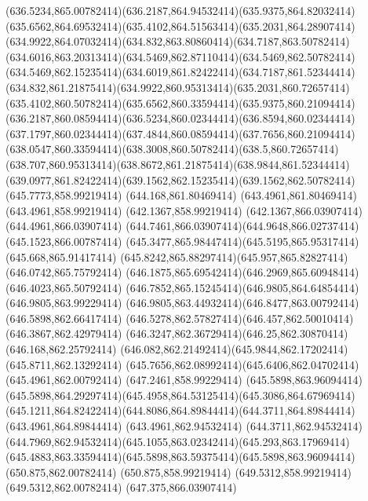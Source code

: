 {{	\curveto(636.5234,865.00782414)(636.2187,864.94532414)(635.9375,864.82032414)
	\curveto(635.6562,864.69532414)(635.4102,864.51563414)(635.2031,864.28907414)
	\curveto(634.9922,864.07032414)(634.832,863.80860414)(634.7187,863.50782414)
	\curveto(634.6016,863.20313414)(634.5469,862.87110414)(634.5469,862.50782414)
	\curveto(634.5469,862.15235414)(634.6019,861.82422414)(634.7187,861.52344414)
	\curveto(634.832,861.21875414)(634.9922,860.95313414)(635.2031,860.72657414)
	\curveto(635.4102,860.50782414)(635.6562,860.33594414)(635.9375,860.21094414)
	\curveto(636.2187,860.08594414)(636.5234,860.02344414)(636.8594,860.02344414)
	\curveto(637.1797,860.02344414)(637.4844,860.08594414)(637.7656,860.21094414)
	\curveto(638.0547,860.33594414)(638.3008,860.50782414)(638.5,860.72657414)
	\curveto(638.707,860.95313414)(638.8672,861.21875414)(638.9844,861.52344414)
	\curveto(639.0977,861.82422414)(639.1562,862.15235414)(639.1562,862.50782414)
	\closepath
	\moveto(645.7773,858.99219414)
	\lineto(644.168,861.80469414)
	\lineto(643.4961,861.80469414)
	\lineto(643.4961,858.99219414)
	\lineto(642.1367,858.99219414)
	\lineto(642.1367,866.03907414)
	\lineto(644.4961,866.03907414)
	\curveto(644.7461,866.03907414)(644.9648,866.02737414)(645.1523,866.00787414)
	\curveto(645.3477,865.98447414)(645.5195,865.95317414)(645.668,865.91417414)
	\curveto(645.8242,865.88297414)(645.957,865.82827414)(646.0742,865.75792414)
	\curveto(646.1875,865.69542414)(646.2969,865.60948414)(646.4023,865.50792414)
	\curveto(646.7852,865.15245414)(646.9805,864.64854414)(646.9805,863.99229414)
	\curveto(646.9805,863.44932414)(646.8477,863.00792414)(646.5898,862.66417414)
	\curveto(646.5278,862.57827414)(646.457,862.50010414)(646.3867,862.42979414)
	\curveto(646.3247,862.36729414)(646.25,862.30870414)(646.168,862.25792414)
	\curveto(646.082,862.21492414)(645.9844,862.17202414)(645.8711,862.13292414)
	\curveto(645.7656,862.08992414)(645.6406,862.04702414)(645.4961,862.00792414)
	\lineto(647.2461,858.99229414)
	\closepath
	\moveto(645.5898,863.96094414)
	\curveto(645.5898,864.29297414)(645.4958,864.53125414)(645.3086,864.67969414)
	\curveto(645.1211,864.82422414)(644.8086,864.89844414)(644.3711,864.89844414)
	\lineto(643.4961,864.89844414)
	\lineto(643.4961,862.94532414)
	\lineto(644.3711,862.94532414)
	\curveto(644.7969,862.94532414)(645.1055,863.02342414)(645.293,863.17969414)
	\curveto(645.4883,863.33594414)(645.5898,863.59375414)(645.5898,863.96094414)
	\closepath
	\moveto(650.875,862.00782414)
	\lineto(650.875,858.99219414)
	\lineto(649.5312,858.99219414)
	\lineto(649.5312,862.00782414)
	\lineto(647.375,866.03907414)
}}
